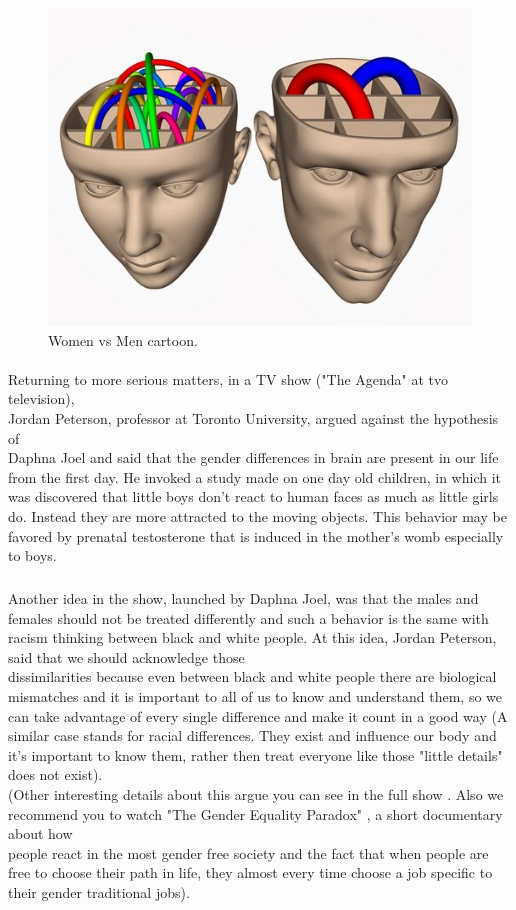 \documentclass[paper=a4, fontsize=11pt]{scrartcl} %
\numberwithin{equation}{section} %
\numberwithin{figure}{section} %
\numberwithin{table}{section} %
\begin{document}
		\begin{figure}[h!]
			\centering
			\includegraphics[scale=0.5]	{connectionesCerebrales.jpg}
		 	\caption{Women vs Men cartoon.}
 		
  			\label{fig:boat1}
  			
		\end{figure}

	\newpage\paragraph{}
		Returning to more serious matters, in a TV show ("The Agenda" at tvo television), \\Jordan Peterson, professor at Toronto University, argued against the hypothesis of\\ Daphna Joel and said that the gender differences in brain are present in our life from the first day. He invoked a study made on one day old children, in which it was discovered that little boys don't react to human faces as much as little girls do. Instead they are more attracted to the moving objects. This behavior may be favored by prenatal testosterone that is induced in the mother's womb especially to boys.\subparagraph{}
		Another idea in the show, launched by Daphna Joel, was that the  males and females should not be treated differently and such a behavior is the same with racism thinking between black and white people. At this idea, Jordan Peterson, said that we should acknowledge  those\\ dissimilarities because even between black and white people there are biological mismatches and it is important to all of us to know and understand them, so we can take advantage of every single difference and make it count in a good way (A similar case stands for racial differences. They exist and influence our body and it's important to know them, rather then treat everyone like those "little details" does not exist).\\
		(Other interesting details about this argue you can see in the full show \cite{TheAgenda}. Also we recommend you to watch "The Gender Equality Paradox" \cite{GEP}, a short documentary about how\\ people react in the most gender free society and the fact that when people are free to choose their path in life, they almost every time choose a job specific to their gender traditional jobs).		
			\newpage
\end{document}
